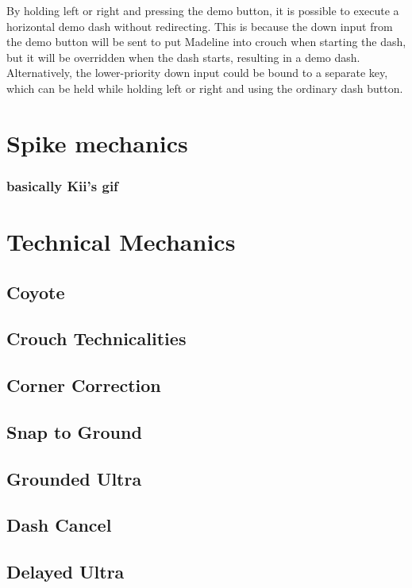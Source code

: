 \documentclass[oneside]{book}
\begin{document}
By holding left or right and pressing the demo button, it is possible to execute a horizontal demo dash without redirecting. This is because the down input from the demo button will be sent to put Madeline into crouch when starting the dash, but it will be overridden when the dash starts, resulting in a demo dash. Alternatively, the lower-priority down input could be bound to a separate key, which can be held while holding left or right and using the ordinary dash button.

\chapter{Spike mechanics}

\subsection{basically Kii's gif}

\chapter{Technical Mechanics}

\section{Coyote}

\section{Crouch Technicalities}

\section{Corner Correction}

\section{Snap to Ground}

\section{Grounded Ultra}

\section{Dash Cancel}

\section{Delayed Ultra}
\end{document}
